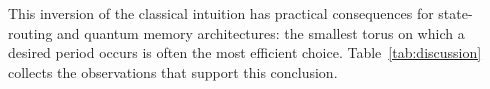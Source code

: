 This inversion of the classical intuition has practical consequences
for state-routing and quantum memory architectures: the smallest
torus on which a desired period occurs is often the most efficient
choice. Table~\ref{tab:discussion} collects the observations that
support this conclusion.
